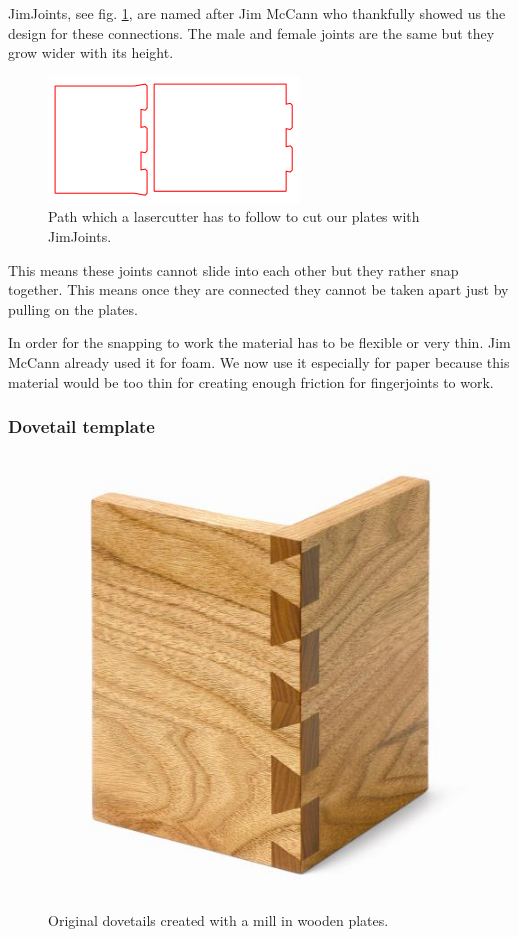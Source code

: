\documentclass[../ClassicThesis.tex]{subfiles}
\begin{document}
JimJoints, see fig. \ref{fig:jimJoints}, are named after Jim McCann who thankfully showed us the design for these connections.
The male and female joints are the same but they grow wider with its height.

\begin{figure}[!ht]
\centering
\includegraphics[width=.5\columnwidth]{Images/jimjoints.png}
\caption{Path which a lasercutter has to follow to cut our plates with JimJoints.}
\label{fig:jimJoints}
\end{figure}

This means these joints cannot slide into each other but they rather snap together. This means once they are connected they cannot be taken apart just by pulling on the plates. 

In order for the snapping to work the material has to be flexible or very thin. Jim McCann already used it for foam. We now use it especially for paper because this material would be too thin for creating enough friction for fingerjoints to work.

\subsubsection{Dovetail template}
\begin{figure}[!ht]
\centering
\includegraphics[width=.5\columnwidth]{Images/dovetails-wood.jpg}
\caption{Original dovetails created with a mill in wooden plates.}
\label{fig:realDovetailJoints}
\end{figure}
\end{document}
